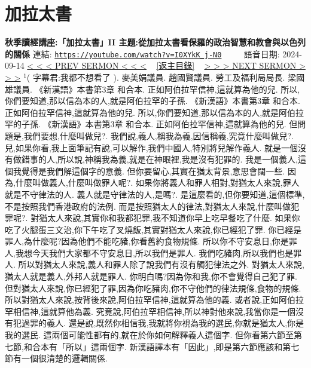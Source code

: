 \documentclass{book}
\begin{document}
\section{加拉太書}
\label{sec:I0XYkK_j_N0}
\textbf{秋季讀經講座:「加拉太書」II 主題:從加拉太書看保羅的政治智慧和教會與以色列的關係}
\newline
\newline
連結: \href{https://youtube.com/watch?v=I0XYkK_j-N0}{\texttt{https://youtube.com/watch?v=I0XYkK\_j-N0}} ~~~~ 語音日期: 2024-09-14
\newline
\newline
\hyperref[sec:sEvrhOW5UYA]{\small{< < < PREV SERMON < < <}}
~
\hyperref[sec:index]{\small{[返主目錄]}}
~
\hyperref[sec:JHWtWav3_Y8]{\small{> > > NEXT SERMON > > >}}
\newline
\newline
$^{1}$( 字幕君:我都不想看了 ).
麥美娟議員.
趙國賢議員.
勞工及福利局局長.
梁國雄議員.
《新漢語》本書第3章 和合本.
正如阿伯拉罕信神,這就算為他的兒.
所以,你們要知道,那以信為本的人,就是阿伯拉罕的子孫.
《新漢語》本書第3章 和合本.
正如阿伯拉罕信神,這就算為他的兒.
所以,你們要知道,那以信為本的人,就是阿伯拉罕的子孫.
《新漢語》本書第3章 和合本.
正如阿伯拉罕信神,這就算為他的兒.
但問題是,我們要想,什麼叫做兒?.
我們說,義人,稱我為義,因信稱義,究竟什麼叫做兒?.
兒,如果你看,我上面筆記有說,可以解作,我們中國人,特別將兒解作義人.
就是一個沒有做錯事的人,所以說,神稱我為義,就是在神眼裡,我是沒有犯罪的.
我是一個義人,這個我覺得是我們解這個字的意義.
但你要留心,其實在猶太背景,意思會闊一些.
因為,什麼叫做義人,什麼叫做罪人呢?.
如果你將義人和罪人相對,對猶太人來說,罪人就是不守律法的人.
義人就是守律法的人,是嗎?.
是這麼看的,但你要知道,這個標準,不是按照我們香港政府的法例.
而是按照猶太人的律法,對猶太人來說,什麼叫做犯罪呢?.
對猶太人來說,其實你和我都犯罪,我不知道你早上吃早餐吃了什麼.
如果你吃了火腿蛋三文治,你下午吃了叉燒飯,其實對猶太人來說,你已經犯了罪.
你已經是罪人,為什麼呢?因為他們不能吃豬,你看舊約食物規條.
所以你不守安息日,你是罪人,我想今天我們大家都不守安息日,所以我們是罪人.
我們吃豬肉,所以我們也是罪人.
所以對猶太人來說,義人和罪人除了說我們有沒有觸犯律法之外.
對猶太人來說,猶太人就是義人,外邦人就是罪人.
你明白嗎?因為你和我,你不會覺得自己犯了罪.
但對猶太人來說,你已經犯了罪,因為你吃豬肉,你不守他們的律法規條,食物的規條.
所以對猶太人來說,按背後來說,阿伯拉罕信神,這就算為他的義.
或者說,正如阿伯拉罕相信神,這就算他為義.
究竟說,阿伯拉罕相信神,所以神對他來說,我當你是一個沒有犯過罪的義人.
還是說,既然你相信我,我就將你視為我的選民,你就是猶太人,你是我的選民.
這兩個可能性都有的,就在於你如何解釋義人這個字.
但你看第六節至第七節,和合本有「所以」這兩個字.
新漢語譯本有「因此」,即是第六節應該和第七節有一個很清楚的邏輯關係.
\end{document}
